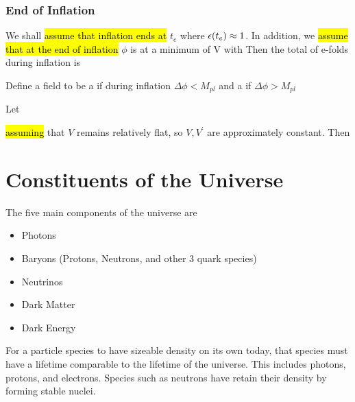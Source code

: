 \documentclass{article}
\begin{document}
\subsubsection*{End of Inflation}
We shall \hl{assume that inflation ends at} $t_e$ where $\epsilon(t_e)\approx 1$. In addition, we \hl{assume that at the end of inflation} $\phi$ is at a minimum of V with 
Then the total of e-folds during inflation is 

\begin{definition}
Define a field to be a  if during inflation $\Delta \phi < M_{pl}$ and a  if $\Delta \phi > M_{pl}$
\end{definition}

\begin{definition}
Let 
\end{definition}
\hl{assuming} that $V$ remains relatively flat, so $V,V^\prime$ are approximately constant. Then 

\section{Constituents of the Universe}
The five main components of the universe are 
\begin{itemize}
    \item Photons
    \item Baryons (Protons, Neutrons, and other 3 quark species)
    \item Neutrinos
    \item Dark Matter 
    \item Dark Energy
\end{itemize}
For a particle species to have sizeable density on its own today, that species must have a lifetime comparable to the lifetime of the universe. This includes photons, protons, and electrons. Species such as neutrons have retain their density by forming stable nuclei. 
\end{document}
